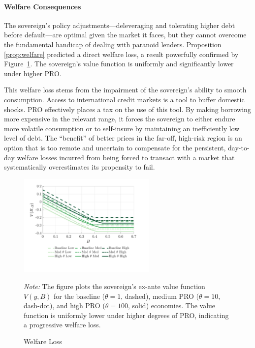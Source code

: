 \documentclass[12pt]{article}
\theoremstyle{plain}
\begin{document}
\paragraph{Welfare Consequences}
The sovereign's policy adjustments—deleveraging and tolerating higher debt
before default—are optimal given the market it faces, but they cannot overcome
the fundamental handicap of dealing with paranoid lenders. Proposition
\ref{prop:welfare} predicted a direct welfare loss, a result powerfully
confirmed by Figure~\ref{fig:welfare_loss}. The sovereign's value function is
uniformly and significantly lower under higher PRO.

This welfare loss stems from the impairment of the sovereign's ability to
smooth consumption. Access to international credit markets is a tool to buffer
domestic shocks. PRO effectively places a tax on the use of this tool. By
making borrowing more expensive in the relevant range, it forces the sovereign
to either endure more volatile consumption or to self-insure by maintaining an
inefficiently low level of debt. The ``benefit'' of better prices in the
far-off, high-risk region is an option that is too remote and uncertain to
compensate for the persistent, day-to-day welfare losses incurred from being
forced to transact with a market that systematically overestimates its
propensity to fail.

\begin{figure}[h!]
	\centering
	\includegraphics[width=0.6\textwidth]{../../pro-default-model/results/comparison_figure_1.pdf}
	\caption{Welfare Loss}
	\label{fig:welfare_loss}
	\parbox{\linewidth}{\small\textit{Note:} The figure plots the sovereign's ex-ante value function $V(y, B)$ for the baseline ($\theta=1$, dashed), medium PRO ($\theta=10$, dash-dot), and high PRO ($\theta=100$, solid) economies. The value function is uniformly lower under higher degrees of PRO, indicating a progressive welfare loss.}
\end{figure}
\end{document}
